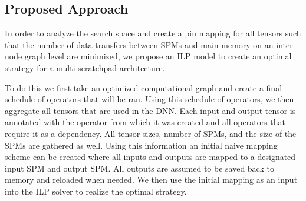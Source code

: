 \subsection{Proposed Approach}
In order to analyze the search space and create a pin mapping for all tensors
such that the number of data transfers between SPMs and main memory on an
inter-node graph level are minimized, we propose an ILP model to create an
optimal strategy for a multi-scratchpad architecture.

To do this we first take an optimized computational graph and create a final
schedule of operators that will be ran. Using this schedule of operators, we
then aggregate all tensors that are used in the DNN. Each input and output
tensor is annotated with the operator from which it was created and all
operators that require it as a dependency. All tensor sizes, number of SPMs,
and the size of the SPMs are gathered as well. Using this information an
initial naive mapping scheme can be created where all inputs and outputs are
mapped to a designated input SPM and output SPM. All outputs are assumed to be
saved back to memory and reloaded when needed. We then use the initial mapping
as an input into the ILP solver to realize the optimal strategy.
